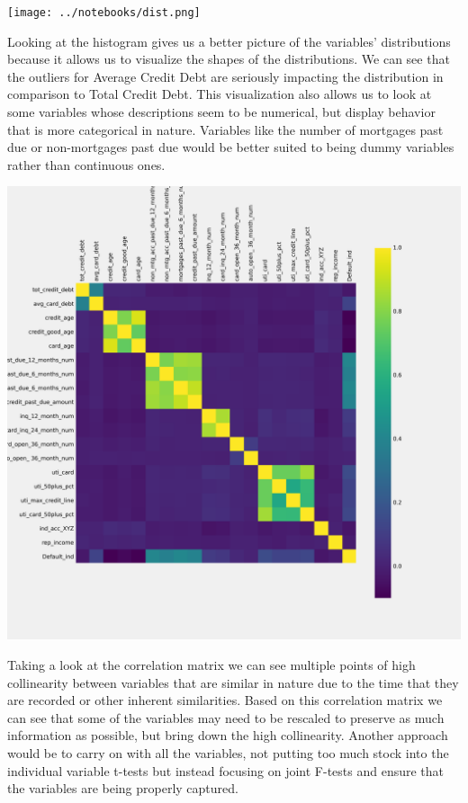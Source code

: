 \documentclass[12pt]{article}
\begin{document}
	\begin{center}
			\texttt{[image: ../notebooks/dist.png]}
	\end{center}


	Looking at the histogram gives us a better picture of the variables' distributions because it allows us to visualize the shapes of the distributions. We can see that the outliers for Average Credit Debt are seriously impacting the distribution in comparison to Total Credit Debt. This visualization also allows us to look at some variables whose descriptions seem to be numerical, but display behavior that is more categorical in nature. Variables like the number of mortgages past due or non-mortgages past due would be better suited to being dummy variables rather than continuous ones. 
	
	\begin{center}
		\includegraphics[scale = 0.3]{../notebooks/CorMat.png}
	\end{center}
	
	Taking a look at the correlation matrix we can see multiple points of high collinearity between variables that are similar in nature due to the time that they are recorded or other inherent similarities. Based on this correlation matrix we can see that some of the variables may need to be rescaled to preserve as much information as possible, but bring down the high collinearity. Another approach would be to carry on with all the variables, not putting too much stock into the individual variable t-tests but instead focusing on joint F-tests and ensure that the variables are being properly captured. 
	
\end{document}
